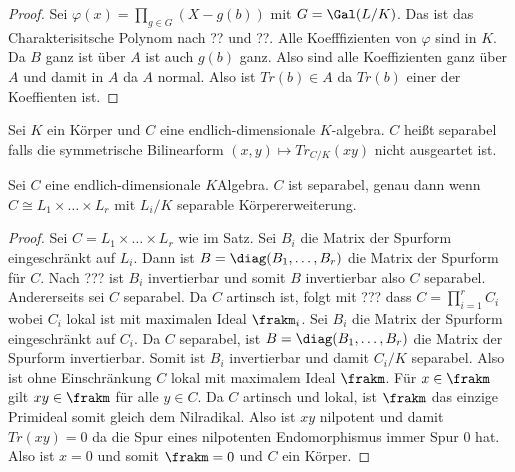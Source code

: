 \begin{proof}
	Sei \(\varphi(x)=\prod_{g\in G}(X-g(b))\) mit \(G=\Gal(L/K)\). Das ist das Charakterisitsche Polynom nach ?? und ??.
	Alle Koefffizienten von \(\varphi\) sind in \(K\). Da \(B\) ganz ist über \(A\) ist auch \(g(b)\) ganz.
	Also sind alle Koeffizienten ganz über \(A\) und damit in \(A\) da \(A\) normal.
	Also ist \(Tr(b)\in A\) da \(Tr(b)\) einer der Koeffienten ist.
\end{proof}
\begin{Def}
	Sei \(K\) ein Körper und \(C\) eine endlich-dimensionale \(K\)-algebra. \(C\) heißt separabel falls die symmetrische Bilinearform \((x,y)\mapsto Tr_{C/K}(xy)\) nicht ausgeartet ist.
\end{Def}
\begin{Lemma}
	Sei \(C\) eine endlich-dimensionale \(K\)Algebra.
	\(C\) ist separabel, genau dann wenn \(C\cong L_1\times\dots\times L_r\) mit \(L_i/K\) separable Körpererweiterung.
\end{Lemma}
\begin{proof}
	Sei \(C=L_1\times\dots\times L_r\) wie im Satz.
	Sei \(B_i\) die Matrix der Spurform eingeschränkt auf \(L_i\).
	Dann ist \(B=\diag(B_1,\dots,B_r)\) die Matrix der Spurform für \(C\).
	Nach ??? ist \(B_i\) invertierbar und somit \(B\) invertierbar also \(C\) separabel.
	Andererseits sei \(C\) separabel.
	Da \(C\) artinsch ist, folgt mit ??? dass 
	\(C=\prod_{i=1}^rC_i\) wobei \(C_i\) lokal ist mit maximalen Ideal \(\frakm_i\).
	Sei \(B_i\) die Matrix der Spurform eingeschränkt auf \(C_i\).
	Da \(C\) separabel, ist \(B=\diag(B_1,\dots,B_r)\) die Matrix der Spurform invertierbar. Somit ist \(B_i\) invertierbar und damit \(C_i/K\) separabel.
	Also ist ohne Einschränkung \(C\) lokal mit maximalem Ideal \(\frakm\).
	Für \(x\in\frakm\) gilt \(xy\in \frakm\) für alle \(y\in C\). Da \(C\) artinsch und lokal, ist \(\frakm\) das einzige Primideal somit gleich dem Nilradikal.
	Also ist \(xy\) nilpotent und damit \(Tr(xy)=0\) da die Spur eines nilpotenten Endomorphismus immer Spur 0 hat.
	Also ist \(x=0\) und somit \(\frakm=0\) und \(C\) ein Körper.
	
\end{proof}